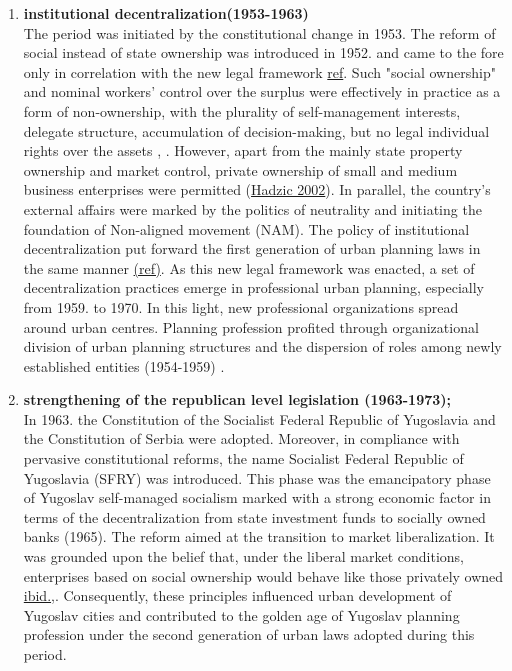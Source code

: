 \documentclass[11pt]{report}
\begin{document}
\begin{enumerate}
\item  \textbf{institutional decentralization(1953-1963)}
\\
The period was initiated by the constitutional change in 1953.
The reform of social instead of state ownership was introduced in 1952. and came to the fore only in correlation with the new legal framework \href{}{ref}.
Such "social ownership" and nominal workers' control over the surplus were effectively in practice as a form of non-ownership, with the plurality of self-management interests, delegate structure, accumulation of decision-making, but no legal individual rights over the assets \href{}{\citealt{estrin_yugoslavia:_1991}}, \href{}{\citealt{zec_economic_2012}}.
However, apart from the mainly state property ownership and market control, private ownership of small and medium business enterprises were permitted (\href{}{Hadzic 2002}).
In parallel, the country's external affairs were marked by the politics of neutrality and initiating the foundation of Non-aligned movement (NAM).
The policy of institutional decentralization put forward the first generation of urban planning laws in the same manner \href{}{(ref)}.
As this new legal framework was enacted, a set of decentralization practices emerge in professional urban planning, especially from 1959. to 1970.
In this light, new professional organizations spread around urban centres.
Planning profession profited through organizational division of urban planning structures and the dispersion of roles among newly established entities (1954-1959) \href{}{\citealt{nedovic-budic_mornings_2011}}. 

\item  \textbf{strengthening of the republican level legislation (1963-1973);}
\\
In 1963. the Constitution of the Socialist Federal Republic of Yugoslavia  and the Constitution of Serbia were adopted.
Moreover, in compliance with pervasive constitutional reforms, the name Socialist Federal Republic of Yugoslavia (SFRY) was introduced.
This phase was the emancipatory phase of Yugoslav self-managed socialism marked with a strong economic factor in terms of the decentralization from state investment  funds  to  socially  owned  banks (1965).
The reform aimed at the transition to market liberalization.
It was grounded upon the belief that, under the liberal market conditions, enterprises based on social ownership would behave like those privately owned \href{}{ibid.},\href{}{\citealt{zec_economic_2012}}.
Consequently, these principles influenced urban development of Yugoslav cities and contributed to the golden age of Yugoslav planning profession under the second generation of urban laws adopted during this period.
\\


\end{enumerate}
\end{document}
